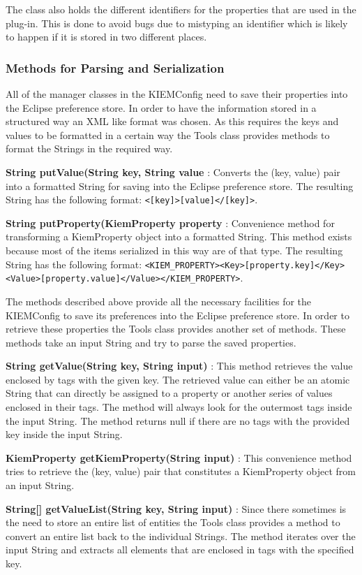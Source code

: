 The class also holds the different identifiers for the properties that are used in the plug-in. This is done
to avoid bugs due to mistyping an identifier which is likely to happen if it is stored in two different places.

\subsubsection{Methods for Parsing and Serialization}
\label{section:ToolsMethodsParsing}
All of the manager classes in the \ac{KIEMConfig} need to save their properties into the Eclipse preference store.
In order to have the information stored in a structured way an \ac{XML} like format was chosen. As this requires the keys and values
to be formatted in a certain way the Tools class provides methods to format the Strings in the required way.
\lstset{
backgroundcolor=,
}
\begin{description}
 \item \textbf{String putValue(String key, String value} : Converts the (key, value) pair into a formatted String for saving
into the Eclipse preference store. The resulting String has the following format: 
\lstinline|<[key]>[value]</[key]>|.
 \item \textbf{String putProperty(KiemProperty property} : Convenience method for transforming a KiemProperty object into a
formatted String. This method exists because most of the items serialized in this way are of that type. The resulting String
has the following format: \lstinline|<KIEM_PROPERTY><Key>[property.key]</Key><Value>[property.value]</Value></KIEM_PROPERTY>|.
\end{description}

The methods described above provide all the necessary facilities for the \ac{KIEMConfig} to save its preferences
into the Eclipse preference store. In order to retrieve these properties the Tools class provides another set of
methods. These methods take an input String and try to parse the saved properties.
\begin{description}
 \item \textbf{String getValue(String key, String input)} : This method retrieves the value enclosed by tags with
the given key. The retrieved value can either be an atomic String that can directly be assigned to a property or
another series of values enclosed in their tags. The method will always look for the outermost tags inside the
input String. The method returns null if there are no tags with the provided key inside the input String.
 \item \textbf{KiemProperty getKiemProperty(String input)} : This convenience method tries to retrieve the 
(key, value) pair that constitutes a KiemProperty object from an input String.
 \item \textbf{String[] getValueList(String key, String input)} : Since there sometimes is the need to store an entire
list of entities the Tools class provides a method to convert an entire list back to the individual Strings.
The method iterates over the input String and extracts all elements that are enclosed in tags with the specified key.
\end{description}


